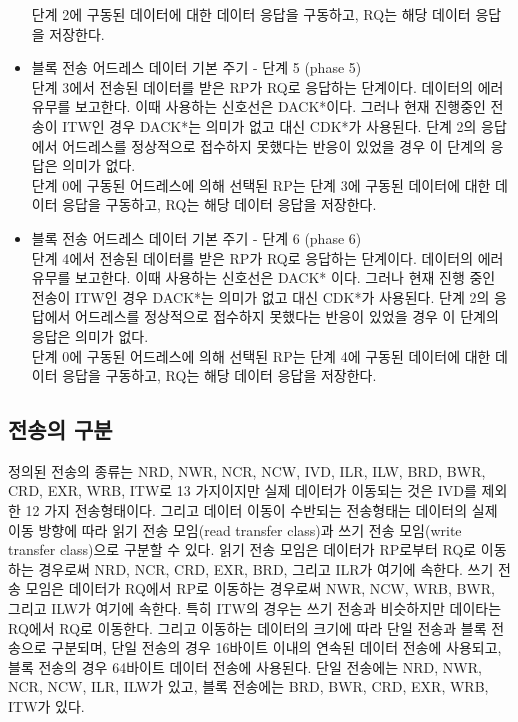 \begin{itemize}
	단계 2에 구동된 데이터에 대한 데이터 응답을 구동하고, RQ는 해당 데이터 응답을 저장한다. \\
%
	\item 블록 전송 어드레스 데이터 기본 주기 - 단계 5 (phase 5)\\
	단계 3에서 전송된 데이터를 받은 RP가 RQ로 응답하는 단계이다.
	데이터의 에러 유무를 보고한다. 이때 사용하는 신호선은 DACK*이다.
	그러나 현재 진행중인 전송이 ITW인 경우 DACK*는 의미가 없고 대신 CDK*가 사용된다.
	단계 2의 응답에서 어드레스를 정상적으로 접수하지 못했다는 반응이 있었을 경우
	이 단계의 응답은 의미가 없다. \\
	단계 0에 구동된 어드레스에 의해 선택된 RP는
	단계 3에 구동된 데이터에 대한 데이터 응답을 구동하고, RQ는 해당 데이터 응답을 저장한다. \\
%
	\item 블록 전송 어드레스 데이터 기본 주기 - 단계 6 (phase 6)\\
	단계 4에서 전송된 데이터를 받은 RP가 RQ로 응답하는 단계이다.
	데이터의 에러 유무를 보고한다. 이때 사용하는 신호선은 DACK* 이다.
	그러나 현재 진행 중인 전송이 ITW인 경우 DACK*는 의미가 없고 대신 CDK*가 사용된다.
	단계 2의 응답에서 어드레스를 정상적으로 접수하지 못했다는 반응이 있었을 경우
	이 단계의 응답은 의미가 없다. \\
	단계 0에 구동된 어드레스에 의해 선택된 RP는
	단계 4에 구동된 데이터에 대한 데이터 응답을 구동하고, RQ는 해당 데이터 응답을 저장한다. \\
%
\end{itemize}
%
%
\subsection{전송의 구분}
정의된 전송의 종류는 NRD, NWR, NCR, NCW, IVD,
ILR, ILW, BRD, BWR, CRD, EXR, WRB, ITW로
13 가지이지만 실제 데이터가 이동되는 것은 IVD를 제외한 12 가지 전송형태이다.
그리고 데이터 이동이 수반되는 전송형태는 데이터의 실제 이동 방향에 따라
읽기 전송 모임(read transfer class)과 쓰기 전송 모임(write transfer class)으로 구분할 수 있다.
읽기 전송 모임은 데이터가 RP로부터 RQ로 이동하는 경우로써 NRD, NCR, CRD, EXR, BRD,
그리고 ILR가 여기에 속한다.
쓰기 전송 모임은 데이터가 RQ에서 RP로 이동하는 경우로써 NWR, NCW, WRB, BWR, 그리고 ILW가 여기에 속한다.
특히 ITW의 경우는 쓰기 전송과 비슷하지만 데이타는 RQ에서 RQ로 이동한다.
그리고 이동하는 데이터의 크기에 따라 단일 전송과 블록 전송으로 구분되며,
단일 전송의 경우 16바이트 이내의 연속된 데이터 전송에 사용되고,
블록 전송의 경우 64바이트 데이터 전송에 사용된다.
단일 전송에는 NRD, NWR, NCR, NCW, ILR, ILW가 있고,
블록 전송에는 BRD, BWR, CRD, EXR, WRB, ITW가 있다.
%
